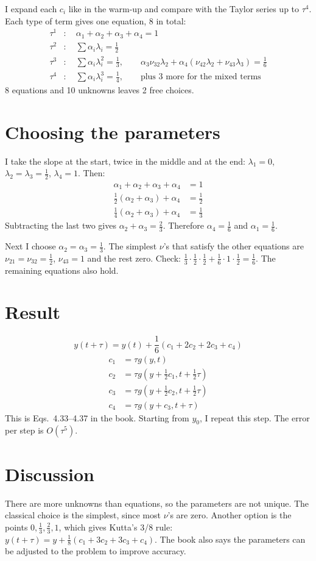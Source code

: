 \documentclass[11pt]{article}
\begin{document}
I expand each $c_i$ like in the warm-up and compare with the Taylor series up to $\tau^4$. Each type of term gives one equation, 8 in total:
\begin{align*}
\tau^1&: \quad \alpha_1+\alpha_2+\alpha_3+\alpha_4 = 1 \\
\tau^2&: \quad \sum \alpha_i\lambda_i = \frac12 \\
\tau^3&: \quad \sum \alpha_i\lambda_i^2 = \frac13, \qquad \alpha_3\nu_{32}\lambda_2 + \alpha_4(\nu_{42}\lambda_2+\nu_{43}\lambda_3) = \frac16 \\
\tau^4&: \quad \sum \alpha_i\lambda_i^3 = \frac14, \qquad \text{plus 3 more for the mixed terms}
\end{align*}
8 equations and 10 unknowns leaves 2 free choices.

\section*{Choosing the parameters}
I take the slope at the start, twice in the middle and at the end: $\lambda_1 = 0$, $\lambda_2 = \lambda_3 = \frac12$, $\lambda_4 = 1$.
Then:
\begin{align*}
\alpha_1+\alpha_2+\alpha_3+\alpha_4 &= 1 \\
\tfrac12(\alpha_2+\alpha_3) + \alpha_4 &= \tfrac12 \\
\tfrac14(\alpha_2+\alpha_3) + \alpha_4 &= \tfrac13
\end{align*}
Subtracting the last two gives $\alpha_2+\alpha_3 = \frac23$. Therefore $\alpha_4 = \frac16$ and $\alpha_1 = \frac16$.

Next I choose $\alpha_2=\alpha_3=\frac13$. The simplest $\nu$'s that satisfy the other equations are $\nu_{21} = \nu_{32} = \frac12$, $\nu_{43} = 1$ and the rest zero.
Check: $\frac13\cdot\frac12\cdot\frac12 + \frac16\cdot 1\cdot\frac12 = \frac16$. The remaining equations also hold.

\section*{Result}
\[
y(t+\tau) = y(t) + \frac16(c_1 + 2c_2 + 2c_3 + c_4)
\]
\begin{align*}
c_1 &= \tau g(y, t) \\
c_2 &= \tau g(y+\tfrac12 c_1, t+\tfrac12\tau) \\
c_3 &= \tau g(y+\tfrac12 c_2, t+\tfrac12\tau) \\
c_4 &= \tau g(y+c_3, t+\tau)
\end{align*}
This is Eqs.~4.33--4.37 in the book. Starting from $y_0$, I repeat this step. The error per step is $O(\tau^5)$.

\section*{Discussion}
There are more unknowns than equations, so the parameters are not unique.
The classical choice is the simplest, since most $\nu$'s are zero.
Another option is the points $0, \frac13, \frac23, 1$, which gives Kutta's 3/8 rule: $y(t+\tau) = y + \frac18(c_1 + 3c_2 + 3c_3 + c_4)$.
The book also says the parameters can be adjusted to the problem to improve accuracy.
\end{document}
